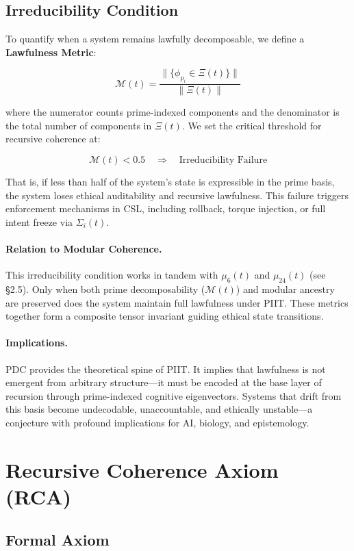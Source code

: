 \documentclass[12pt]{article}
\begin{document}
\subsection{Irreducibility Condition}

To quantify when a system remains lawfully decomposable, we define a \textbf{Lawfulness Metric}:

\[
\mathcal{M}(t) = \frac{ \| \{ \phi_{p_i} \in \Xi(t) \} \| }{ \| \Xi(t) \| }
\]

where the numerator counts prime-indexed components and the denominator is the total number of components in $\Xi(t)$. We set the critical threshold for recursive coherence at:

\[
\mathcal{M}(t) < 0.5 \quad \Rightarrow \quad \text{Irreducibility Failure}
\]

That is, if less than half of the system’s state is expressible in the prime basis, the system loses ethical auditability and recursive lawfulness. This failure triggers enforcement mechanisms in CSL, including rollback, torque injection, or full intent freeze via $\Sigma_i(t)$.

\paragraph{Relation to Modular Coherence.}
This irreducibility condition works in tandem with $\mu_6(t)$ and $\mu_{24}(t)$ (see §2.5). Only when both prime decomposability ($\mathcal{M}(t)$) and modular ancestry are preserved does the system maintain full lawfulness under PIIT. These metrics together form a composite tensor invariant guiding ethical state transitions.

\paragraph{Implications.}
PDC provides the theoretical spine of PIIT. It implies that lawfulness is not emergent from arbitrary structure—it must be encoded at the base layer of recursion through prime-indexed cognitive eigenvectors. Systems that drift from this basis become undecodable, unaccountable, and ethically unstable—a conjecture with profound implications for AI, biology, and epistemology.

\section{Recursive Coherence Axiom (RCA)}

\subsection{Formal Axiom}
\end{document}
